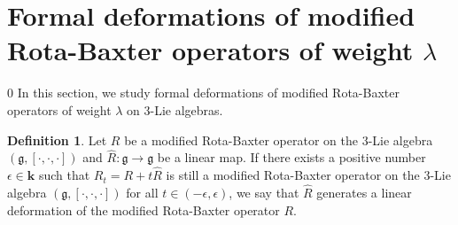 \documentclass[12pt]{amsart}
\theoremstyle{definition}
\newtheorem{defn}[theorem]{Definition}
\begin{document}
\section{Formal deformations  of modified Rota-Baxter operators of weight $\lambda$}\label{Formal deformations  of modified Rota-Baxter operators of weight }
\def\theequation{\arabic{section}.\arabic{equation}}
\setcounter{equation} {0}
In this section, we study  formal  deformations of modified Rota-Baxter operators of weight $\lambda$ on $3$-Lie
algebras.

\begin{defn}
 Let $R$ be a modified Rota-Baxter operator on the $3$-Lie algebra $(\mathfrak{g}, [\cdot, \cdot, \cdot])$ and  $\hat{R}: \mathfrak{g}\rightarrow \mathfrak{g}$ be a
 linear map. If there exists a positive number $\epsilon\in \mathbf{k}$ such that $R_t = R+t \hat{R}$ is still a  modified Rota-Baxter operator
 on the $3$-Lie algebra $(\mathfrak{g}, [\cdot, \cdot, \cdot])$ for all $t\in (-\epsilon, \epsilon)$, we say that $\hat{R}$ generates a linear deformation of
 the  modified Rota-Baxter operator $R$.
\end{defn}
\end{document}
